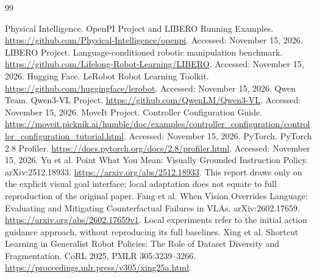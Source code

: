 \begin{thebibliography}{99}
 Physical Intelligence. OpenPI Project and LIBERO Running Examples. \url{https://github.com/Physical-Intelligence/openpi}. Accessed: November 15, 2026.
 LIBERO Project. Language-conditioned robotic manipulation benchmark. \url{https://github.com/Lifelong-Robot-Learning/LIBERO}. Accessed: November 15, 2026.
 Hugging Face. LeRobot Robot Learning Toolkit. \url{https://github.com/huggingface/lerobot}. Accessed: November 15, 2026.
 Qwen Team. Qwen3-VL Project. \url{https://github.com/QwenLM/Qwen3-VL}. Accessed: November 15, 2026.
 MoveIt Project. Controller Configuration Guide. \url{https://moveit.picknik.ai/humble/doc/examples/controller_configuration/controller_configuration_tutorial.html}. Accessed: November 15, 2026.
 PyTorch. PyTorch 2.8 Profiler. \url{https://docs.pytorch.org/docs/2.8/profiler.html}. Accessed: November 15, 2026.
 Yu et al. Point What You Mean: Visually Grounded Instruction Policy. arXiv:2512.18933. \url{https://arxiv.org/abs/2512.18933}. This report draws only on the explicit visual goal interface; local adaptation does not equate to full reproduction of the original paper.
 Fang et al. When Vision Overrides Language: Evaluating and Mitigating Counterfactual Failures in VLAs. arXiv:2602.17659. \url{https://arxiv.org/abs/2602.17659v1}. Local experiments refer to the initial action guidance approach, without reproducing its full baselines.
 Xing et al. Shortcut Learning in Generalist Robot Policies: The Role of Dataset Diversity and Fragmentation. CoRL 2025, PMLR 305:3239--3266. \url{https://proceedings.mlr.press/v305/xing25a.html}.
\end{thebibliography}
